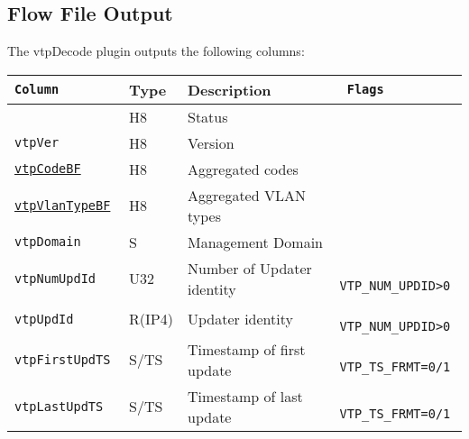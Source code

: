 \documentclass[documentation]{subfiles}
\begin{document}
\subsection{Flow File Output}
The vtpDecode plugin outputs the following columns:
\begin{longtable}{>{\tt}lll>{\tt\small}l}
    \toprule
    {\bf Column}                          & {\bf Type} & {\bf Description}          & {\bf Flags}\\
    \midrule\endhead%
    \nameref{vtpStat}                     & H8         & Status                     & \\
    vtpVer                                & H8         & Version                    & \\
    \hyperref[vtpCode]{vtpCodeBF}         & H8         & Aggregated codes           & \\
    \hyperref[vtpVlanType]{vtpVlanTypeBF} & H8         & Aggregated VLAN types      & \\
    vtpDomain                             & S          & Management Domain          & \\
    vtpNumUpdId                           & U32        & Number of Updater identity & VTP\_NUM\_UPDID>0\\
    vtpUpdId                              & R(IP4)     & Updater identity           & VTP\_NUM\_UPDID>0\\
    vtpFirstUpdTS                         & S/TS       & Timestamp of first update  & VTP\_TS\_FRMT=0/1\\
    vtpLastUpdTS                          & S/TS       & Timestamp of last update   & VTP\_TS\_FRMT=0/1\\
    \bottomrule
\end{longtable}
\end{document}

